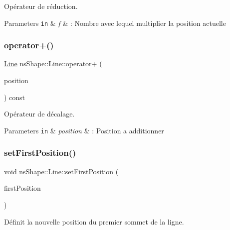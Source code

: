 Opérateur de réduction. 


\begin{DoxyParams}[1]{Parameters}
\mbox{\tt in}  & {\em f} & \+: Nombre avec lequel multiplier la position actuelle \\
\hline
\end{DoxyParams}
\mbox{\label{classns_shape_1_1_line_adddeb7810639aa3eec2756846d40a430}} 
\subsubsection{\texorpdfstring{operator+()}{operator+()}}
{\footnotesize\ttfamily \hyperlink{classns_shape_1_1_line}{Line} ns\+Shape\+::\+Line\+::operator+ (\begin{DoxyParamCaption}\item[{const \hyperlink{classns_graphics_1_1_vec2_d}{ns\+Graphics\+::\+Vec2D} \&}]{position }\end{DoxyParamCaption}) const}



Opérateur de décalage. 


\begin{DoxyParams}[1]{Parameters}
\mbox{\tt in}  & {\em position} & \+: Position a additionner \\
\hline
\end{DoxyParams}
\mbox{\label{classns_shape_1_1_line_a62178d318a6b856e574149f58f9838f9}} 
\subsubsection{\texorpdfstring{set\+First\+Position()}{setFirstPosition()}}
{\footnotesize\ttfamily void ns\+Shape\+::\+Line\+::set\+First\+Position (\begin{DoxyParamCaption}\item[{const \hyperlink{classns_graphics_1_1_vec2_d}{ns\+Graphics\+::\+Vec2D} \&}]{first\+Position }\end{DoxyParamCaption})}



Définit la nouvelle position du premier sommet de la ligne. 


